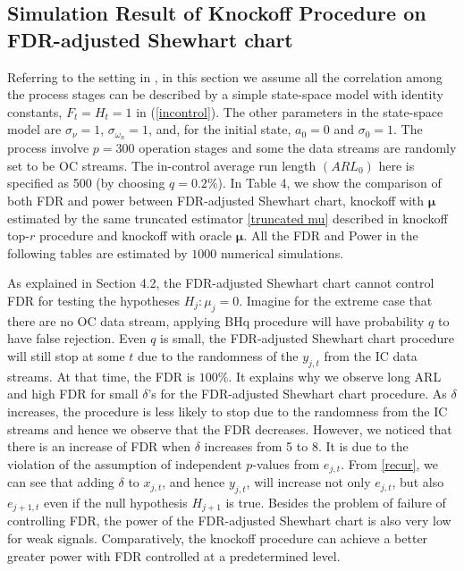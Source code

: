 \documentclass[a4paper,12pt]{article}
\begin{document}
\subsection{Simulation Result of Knockoff Procedure on FDR-adjusted Shewhart chart}
Referring to the setting in \cite{li2009false}, in this section we assume all the correlation among the process stages can be described by a simple state-space model with identity constants, $F_t = H_t = 1$ in (\ref{incontrol}). The other parameters in the state-space model are $\sigma_{\nu} = 1$, $\sigma_{\omega_n} = 1$, and, for the initial state, $a_0 = 0$ and $\sigma_0 = 1$. The process involve $p=300$ operation stages and some the data streams are randomly set to be OC streams. The in-control average run length $(ARL_0)$ here is specified as 500 (by choosing $q=0.2\%$). In Table 4, we show the comparison of both FDR and power between FDR-adjusted Shewhart chart, knockoff with $\bm \mu$ estimated by the same truncated estimator \eqref{truncated mu} described in knockoff top-$r$ procedure and knockoff with oracle $\bm \mu$. All the FDR and Power in the following tables are estimated by $1000$ numerical simulations.
 
As explained in Section 4.2, the FDR-adjusted Shewhart chart cannot control FDR for testing the hypotheses $H_j:\mu_j=0$. Imagine for the extreme case that there are no OC data stream, applying BHq procedure will have probability $q$ to have false rejection. Even $q$ is small, the FDR-adjusted Shewhart chart procedure will still stop at some $t$ due to the randomness of the $y_{j,t}$ from the IC data streams. At that time, the FDR is $100\%$. It explains why we observe long ARL and high FDR for small $\delta$'s for the FDR-adjusted Shewhart chart procedure. As $\delta$ increases, the procedure is less likely to stop due to the randomness from the IC streams and hence we observe that the FDR decreases. However, we noticed that there is an increase of FDR when $\delta$ increases from 5 to 8. It is due to the violation of the assumption of independent $p$-values from $e_{j,t}$. From \eqref{recur}, we can see that adding $\delta$ to $x_{j,t}$, and hence $y_{j,t}$, will increase not only $e_{j,t}$, but also $e_{j+1,t}$ even if the null hypothesis $H_{j+1}$ is true. Besides the problem of failure of controlling FDR, the power of the FDR-adjusted Shewhart chart is also very low for weak signals. Comparatively, the knockoff procedure can achieve a better greater power with FDR controlled at a predetermined level.
\end{document}
